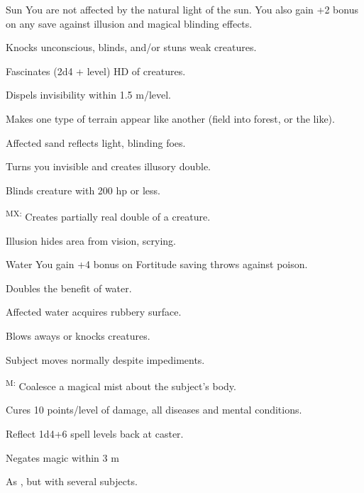 {Sun}
{You are not affected by the natural light of the sun. You also gain +2 bonus on any save against illusion and magical blinding effects.}
{
	\item {} Knocks unconscious, blinds, and/or stuns weak creatures.
	\item {} Fascinates (2d4 + level) HD of creatures.
	\item {} Dispels invisibility within 1.5 m/level.
	\item {} Makes one type of terrain appear like another (field into forest, or the like).
	\item {} Affected sand reflects light, blinding foes.
	\item {} Turns you invisible and creates illusory double.
	\item {} Blinds creature with 200 hp or less.
	\item {}\textsuperscript{MX:} Creates partially real double of a creature.
	\item {} Illusion hides area from vision, scrying.
}

{Water}
{You gain +4 bonus on Fortitude saving throws against poison.}
{
	\item {} Doubles the benefit of water.
	\item {} Affected water acquires rubbery surface.
	\item {} Blows aways or knocks creatures.
	\item {} Subject moves normally despite impediments.
	\item {}\textsuperscript{M:} Coalesce a magical mist about the subject's body.
	\item {} Cures 10 points/level of damage, all diseases and mental conditions.
	\item {} Reflect 1d4+6 spell levels back at caster.
	\item {} Negates magic within 3 m
	\item {} As , but with several subjects.
}

